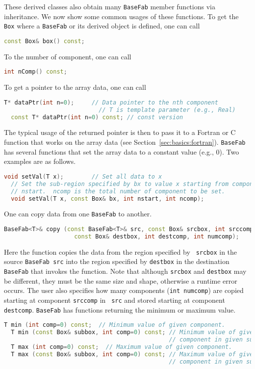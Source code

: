 These derived classes also obtain many {\tt BaseFab} member functions
via inheritance.  We now show some common usages of these functions.
To get the {\tt Box} where a {\tt BaseFab} or its derived object is
defined, one can call
\begin{lstlisting}[language=cpp]
  const Box& box() const;
\end{lstlisting}
To the number of component, one can call
\begin{lstlisting}[language=cpp]
  int nComp() const;
\end{lstlisting}
To get a pointer to the array data, one can call
\begin{lstlisting}[language=cpp]
  T* dataPtr(int n=0);     // Data pointer to the nth component
                           // T is template parameter (e.g., Real)
  const T* dataPtr(int n=0) const; // const version
\end{lstlisting}
The typical usage of the returned pointer is then to pass it to a
Fortran or C function that works on the array data (see
Section~\ref{sec:basics:fortran}).
{\tt BaseFab} has several functions that set the array data to a
constant value (e.g., 0).  Two examples are as follows.  
\begin{lstlisting}[language=cpp]
  void setVal(T x);        // Set all data to x
  // Set the sub-region specified by bx to value x starting from component
  // nstart.  ncomp is the total number of component to be set.
  void setVal(T x, const Box& bx, int nstart, int ncomp);
\end{lstlisting}
One can copy data from one {\tt BaseFab} to another.
\begin{lstlisting}[language=cpp]
  BaseFab<T>& copy (const BaseFab<T>& src, const Box& srcbox, int srccomp,
                    const Box& destbox, int destcomp, int numcomp);
\end{lstlisting}
Here the function copies the data from the region specified by {\tt
  srcbox} in the source {\tt BaseFab src} into the region specified by
{\tt destbox} in the destination {\tt BaseFab} that invokes the
function.  Note that although {\tt srcbox} and {\tt destbox} may be
different, they must be the same size and shape, otherwise a runtime
error occurs.  The user also specifies how many components ({\tt int
  numcomp}) are copied starting at component {\tt srccomp} in {\tt
  src} and stored starting at component {\tt destcomp}.  {\tt BaseFab}
has functions returning the minimum or maximum value.
\begin{lstlisting}[language=cpp] 
  T min (int comp=0) const;  // Minimum value of given component.
  T min (const Box& subbox, int comp=0) const; // Minimum value of given 
                                               // component in given subbox.
  T max (int comp=0) const;  // Maximum value of given component.
  T max (const Box& subbox, int comp=0) const; // Maximum value of given 
                                               // component in given subbox.
\end{lstlisting}


